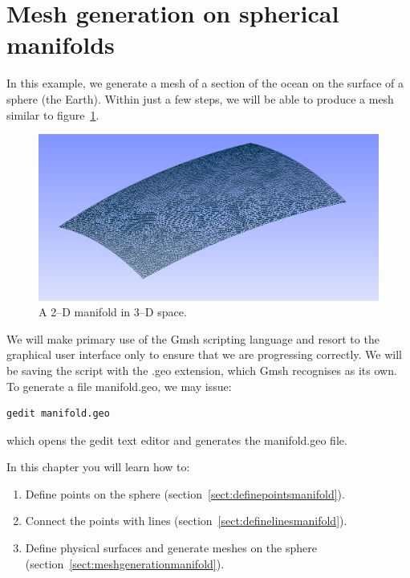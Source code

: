 \section{Mesh generation on spherical manifolds}
\label{sect:spherical_manifolds}
\par

In this example, we generate a mesh of a section of the ocean on the surface of a sphere (the Earth). Within just a few steps, we will be able to produce a mesh
similar to figure~\ref{fig:sphericalpatch}.

\begin{figure}[htbp]
 \centering
  \includegraphics[width=1.0\textwidth]{../figures/sphericalpatch}
  \caption{A 2--D manifold in 3--D space.}
  \label{fig:sphericalpatch}
\end{figure}

We will make primary use of the Gmsh scripting language and resort to the graphical user interface only to ensure that we are progressing correctly. We will be saving the script with the .geo extension, which Gmsh recognises as its own. To generate a file manifold.geo, we may issue:
\begin{lstlisting}
gedit manifold.geo
\end{lstlisting}
which opens the gedit text editor and generates the manifold.geo file.

In this chapter you will learn how to:
\begin{enumerate}
\item Define points on the sphere (section~\ref{sect:definepointsmanifold}).
\item Connect the points with lines (section~\ref{sect:definelinesmanifold}).
\item Define physical surfaces and generate meshes on the sphere (section~\ref{sect:meshgenerationmanifold}).
\end{enumerate}

